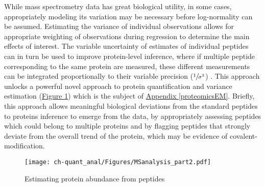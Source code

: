 While mass spectrometry data has great biological utility, in some cases, appropriately modeling its variation may be necessary before log-normality can be assumed. Estimating the variance of individual observations allows for appropriate weighting of observations during regression to determine the main effects of interest.  The variable uncertainty of estimates of individual peptides can in turn be used to improve protein-level inference, where if multiple peptide corresponding to the same protein are measured, these different measurements can be integrated proportionally to their variable precision ($\sfrac{1}{\sigma^{2}}$) \cite{Navarro:2014ke}. This approach unlocks a powerful novel approach to protein quantification and variance estimation (\hyperref[ch-quant_anal:pepToProt]{Figure \ref{ch-quant_anal:pepToProt}}) which is the subject of \hyperref[proteomicsEM]{Appendix \ref{proteomicsEM}}. Briefly, this approach allows meaningful biological deviations from the standard peptides to proteins inference to emerge from the data, by appropriately assessing peptides which could belong to multiple proteins and by flagging peptides that strongly deviate from the overall trend of the protein, which may be evidence of covalent-modification.

\begin{figure}
\begin{center}
\texttt{[image: ch-quant\_anal/Figures/MSanalysis\_part2.pdf]}
\caption[Estimating protein abundance from peptides]{Estimating protein abundance from peptides}
\label{ch-quant_anal:pepToProt}
\end{center}
\end{figure}

